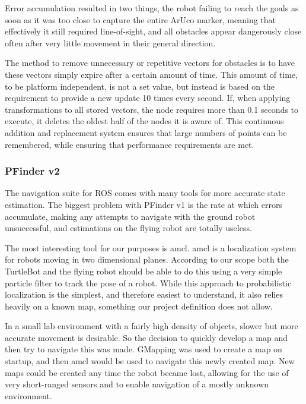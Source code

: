 \documentclass{article}[12]
\begin{document}
 	Error accumulation resulted in two things, the robot failing to reach the goals as soon as it was too close to capture the entire ArUco marker, meaning that effectively it still required line-of-sight, and all obstacles appear dangerously close often after very little movement in their general direction. 


	The method to remove unnecessary or repetitive vectors for obstacles is to have these vectors simply expire after a certain amount of time. This amount of time, to be platform independent, is not a set value, but instead is based on the requirement to provide a new update 10 times every second. If, when applying transformations to all stored vectors, the node requires more than 0.1 seconds to execute, it deletes the oldest half of the nodes it is aware of. This continuous addition and replacement system ensures that large numbers of points can be remembered, while ensuring that performance requirements are met.
	
	\subsubsection{PFinder v2}
	
	The navigation suite for ROS comes with many tools for more accurate state estimation. The biggest problem with PFinder v1 is the rate at which errors accumulate, making any attempts to navigate with the ground robot unsuccessful, and estimations on the flying robot are totally useless.
	
	The most interesting tool for our purposes is amcl. amcl is a localization system for robots moving in two dimensional planes. According to our scope both the TurtleBot and the flying robot should be able to do this using a very simple particle filter to track the pose of a robot. While this approach to probabilistic localization is the simplest, and therefore easiest to understand, it also relies heavily on a known map, something our project definition does not allow.
	
	In a small lab environment with a fairly high density of objects, slower but more accurate movement is desirable. So the decision to quickly develop a map and then try to navigate this was made. GMapping was used to create a map on startup, and then amcl would be used to navigate this newly created map. New maps could be created any time the robot became lost, allowing for the use of very short-ranged sensors and to enable navigation of a mostly unknown environment.
	
\end{document}
